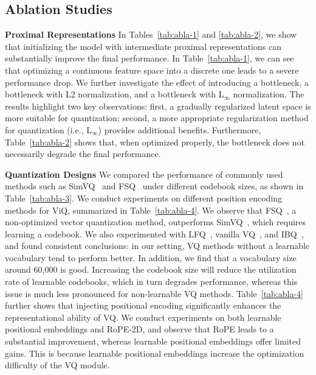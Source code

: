 \documentclass{llmxive}
\providecommand{\paragrapha}[1]{\par\addvspace{0.45em}\noindent\textbf{#1}}
\begin{document}
\subsection{Ablation Studies}

\paragrapha{Proximal Representations}
In Tables~\ref{tab:abla-1} and \ref{tab:abla-2}, we show that initializing the model with intermediate proximal representations can substantially improve the final performance.
In Table~\ref{tab:abla-1}, we can see that optimizing a continuous feature space into a discrete one leads to a severe performance drop. We further investigate the effect of introducing a bottleneck, a bottleneck with L2 normalization, and a bottleneck with L$_\infty$ normalization. The results highlight two key observations: first, a gradually regularized latent space is more suitable for quantization; second, a more appropriate regularization method for quantization (i.e., L$_\infty$) provides additional benefits. Furthermore, Table~\ref{tab:abla-2} shows that, when optimized properly, the bottleneck does not necessarily degrade the final performance.

\paragrapha{Quantization Designs}
We compared the performance of commonly used methods such as SimVQ~\cite{zhu2025addressing} and FSQ~\cite{mentzerfinite} under different codebook sizes, as shown in Table~\ref{tab:abla-3}. We conduct experiments on different position encoding methods for ViQ, summarized in Table~\ref{tab:abla-4}. We observe that FSQ~\cite{mentzerfinite}, a non-optimized vector quantization method, outperforms SimVQ~\cite{zhu2025addressing}, which requires learning a codebook. We also experimented with LFQ~\cite{yulanguage}, vanilla VQ~\cite{gersho2012vector}, and IBQ~\cite{shi2025scalable}, and found consistent conclusions: in our setting, VQ methods without a learnable vocabulary tend to perform better. In addition, we find that a vocabulary size around 60,000 is good. Increasing the codebook size will reduce the utilization rate of learnable codebooks, which in turn degrades performance, whereas this issue is much less pronounced for non-learnable VQ methods. Table~\ref{tab:abla-4} further shows that injecting positional encoding significantly enhances the representational ability of VQ. We conduct experiments on both learnable positional embeddings and RoPE-2D, and observe that RoPE leads to a substantial improvement, whereas learnable positional embeddings offer limited gains. This is because learnable positional embeddings increase the optimization difficulty of the VQ module.
\end{document}
